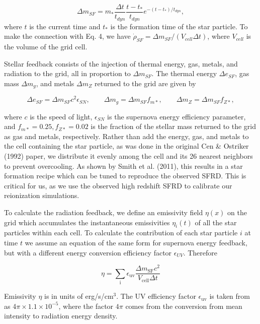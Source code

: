\begin{equation}
\Delta m_{SF} = m_* \frac{\Delta t}{t_{dyn}} \frac{t-t_*}{t_{dyn}} e^{-(t-t_*)/t_{dyn}},
\end{equation}
where $t$ is the current time and $t_*$ is the formation time of the star particle. To make the 
connection with Eq. 4, we have $\dot{\rho}_{SF} =\Delta m_{SF}/(V_{cell}\Delta t)$, 
where $V_{cell}$ is the volume of the grid cell. 

Stellar feedback consists of the injection of thermal energy, gas, metals, and radiation
to the grid, all in proportion to $\Delta m_{SF}$. The thermal energy $\Delta e_{SF}$, gas
mass $\Delta m_g$, and metals $\Delta m_Z$ returned to the grid are given by

\begin{equation}
  \Delta e_{SF} = \Delta m_{SF} c^2 \epsilon_{SN}, \qquad
  \Delta m_g = \Delta m_{SF} f_{m*}, \qquad
  \Delta m_Z = \Delta m_{SF} f_{Z*},
\end{equation}

where $c$ is the speed of light, $\epsilon_{SN}$ is the supernova energy efficiency parameter, and $f_{m*}=0.25, f_{Z*}=0.02$ is the fraction of the stellar mass returned to the grid as gas and metals, respectively. Rather than add
the energy, gas, and metals to the cell containing the star particle, as was done in
the original Cen \& Ostriker (1992) paper, we distribute it evenly among the cell and its
26 nearest neighbors to prevent overcooling. As shown by Smith et al. (2011), this 
results in a star formation recipe which can be tuned to reproduce the observed SFRD. This is critical for us, as we use the observed high redshift SFRD to calibrate our reionization simulations. 

To calculate the radiation feedback, we define an emissivity field $\eta(x)$ on the grid which accumulates
the instantaneous emissivities $\eta_i(t)$ of all the star particles within each cell. To calculate the contribution of each star particle $i$ at time $t$ we assume an equation of the same form for supernova energy feedback, but with a different energy conversion efficiency factor $\epsilon_{UV}$. Therefore

\begin{equation}
\label{eq:emissivity}
  \eta= \sum_\mathrm{i}\epsilon_\mathrm{uv}\frac{\Delta m_\mathrm{SF} c^2}{V_\mathrm{cell}\Delta t}
\end{equation}

Emissivity $\eta$ is in units of erg/s/cm$^3$.   The UV efficiency factor $\epsilon_\mathrm{uv}$ is taken from \cite{RicottiEtAl2002} as 4$\pi\times 1.1 \times 10^{-5}$, where the factor $4\pi$ comes from the conversion from mean intensity to radiation energy density.


